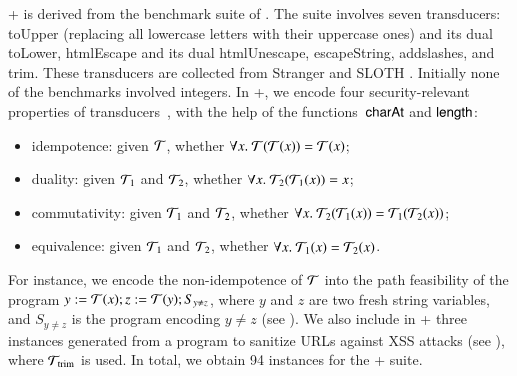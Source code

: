 \smallskip
\noindent \transducerbench+
is derived from the {\transducerbench} benchmark suite of {\ostrich}
\cite{CHL+19}.  The {\transducerbench} suite involves seven
transducers: 
%
%
toUpper (replacing all lowercase letters with their
uppercase ones) and its dual toLower, htmlEscape   and
its dual htmlUnescape, escapeString, addslashes, and trim. 
%
These transducers are
collected from Stranger \cite{YABI14} and SLOTH
\cite{HJLRV18}. Initially none of the benchmarks involved integers. In
{\transducerbench+}, we encode four security-relevant properties of
transducers~\cite{BEK}, with the help of the functions~$\mathsf{charAt}$ and
$\mathsf{length}$:
\begin{itemize}
\item idempotence: given $\mathcal{T}$, whether
  $\forall x.\ \mathcal{T}(\mathcal{T}(x)) = \mathcal{T}(x)$;
\item duality: given $\mathcal{T}_1$ and
  $\mathcal{T}_2$, whether $\forall x.\ \mathcal{T}_2(\mathcal{T}_1(x)) = x$;
\item commutativity: given $\mathcal{T}_1$ and $\mathcal{T}_2$, whether
  $\forall x.\ \mathcal{T}_2(\mathcal{T}_1(x)) = \mathcal{T}_1(\mathcal{T}_2(x))$;
\item equivalence: given $\mathcal{T}_1$ and $\mathcal{T}_2$, whether
  $\forall x.\ \mathcal{T}_1(x) = \mathcal{T}_2(x)$.
\end{itemize}

%
For instance, we encode the non-idempotence of $\mathcal{T}$ into the path feasibility of the {\slint} program $y:=\mathcal{T}(x); z:=\mathcal{T}(y); S_{y \neq z}$, where $y$ and $z$ are two fresh string variables, and $S_{y \neq z}$ is the {\slint} program encoding $y \neq z$ (see 
\iftoggle{full}{Appendix~\ref{appendix:slint-prog-ineq} for the details}{the full version \cite{atva20-full} for the details}
). We also include in {\transducerbench+} three instances %
generated from a program to sanitize URLs against XSS attacks (see \iftoggle{full}{Appendix~\ref{exmp:running} for the details}{the full version \cite{atva20-full} for the details}), 
where $\mathcal{T}_{\rm trim}$ is used. 
In total, we obtain 94 instances for the {\transducerbench+} suite. 

